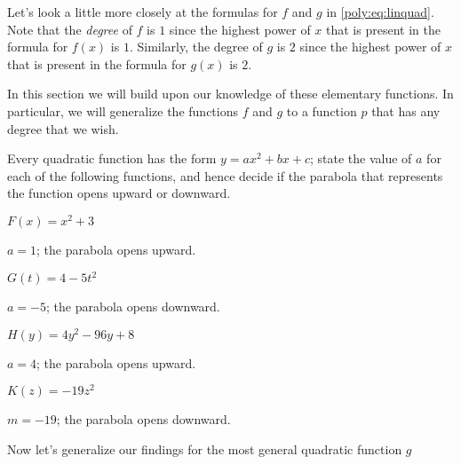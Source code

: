 Let's look a little more closely at the formulas for $f$ and $g$ in 
\cref{poly:eq:linquad}. Note that the \emph{degree} 
of $f$ is $1$ since the highest power of $x$ that is present in the 
formula for $f(x)$ is $1$. Similarly, the degree of $g$ is $2$ since
the highest power of $x$ that is present in the formula for $g(x)$ 
is $2$.

In this section we will build upon our knowledge of these elementary
functions. In particular, we will generalize the functions $f$ and $g$ to a function $p$ that has 
any degree that we wish.

\begin{essentialskills}
\begin{problem}
Every quadratic function has the form $y=ax^2+bx+c$; state the value 
of $a$ for each of the following functions, and hence decide if the 
parabola that represents the function opens upward or downward.
\begin{multicols}{2}
\begin{subproblem}
    $F(x)=x^2+3$ 
    \begin{shortsolution}
    $a=1$; the parabola opens upward. 
    \end{shortsolution}
\end{subproblem}
\begin{subproblem}
    $G(t)=4-5t^2$ 
    \begin{shortsolution}
    $a=-5$; the parabola opens downward. 
    \end{shortsolution}
\end{subproblem}
\begin{subproblem}
    $H(y)=4y^2-96y+8$ 
    \begin{shortsolution}
    $a=4$; the parabola opens upward. 
    \end{shortsolution}
\end{subproblem}
\begin{subproblem}
    $K(z)=-19z^2$ 
    \begin{shortsolution}
    $m=-19$; the parabola opens downward. 
    \end{shortsolution}
\end{subproblem}
\end{multicols}
Now let's generalize our findings for the most general quadratic function $g$

\end{problem}
\end{essentialskills}
